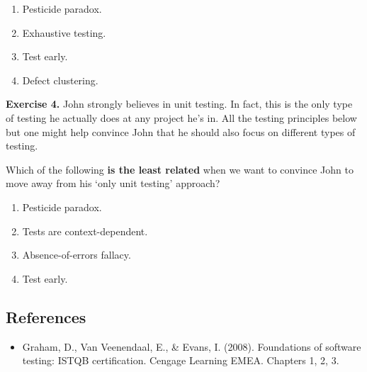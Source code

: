 \begin{enumerate}
\def\labelenumi{\arabic{enumi}.}
\tightlist
\item
  Pesticide paradox.
\item
  Exhaustive testing.
\item
  Test early.
\item
  Defect clustering.
\end{enumerate}

\textbf{Exercise 4.} John strongly believes in unit testing. In fact,
this is the only type of testing he actually does at any project he's
in. All the testing principles below but one might help convince John
that he should also focus on different types of testing.

Which of the following \textbf{is the least related} when we want to
convince John to move away from his `only unit testing' approach?

\begin{enumerate}
\def\labelenumi{\arabic{enumi}.}
\tightlist
\item
  Pesticide paradox.
\item
  Tests are context-dependent.
\item
  Absence-of-errors fallacy.
\item
  Test early.
\end{enumerate}

\hypertarget{references}{%
\subsection{References}\label{references}}

\begin{itemize}
\tightlist
\item
  Graham, D., Van Veenendaal, E., \& Evans, I. (2008). Foundations of
  software testing: ISTQB certification. Cengage Learning EMEA. Chapters
  1, 2, 3.
\end{itemize}
